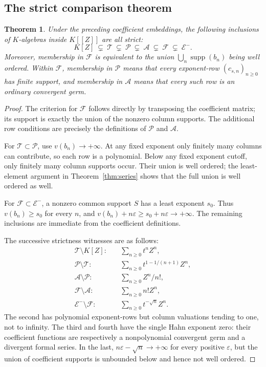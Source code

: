 \documentclass[11pt,a4paper]{article}
\numberwithin{equation}{section}
\newtheorem{theorem}{Theorem}[section]
\theoremstyle{definition}
\theoremstyle{remark}
\newcommand{\TT}{\mathcal T}
\newcommand{\PP}{\mathcal P}
\newcommand{\Ag}{\mathcal A}
\newcommand{\FF}{\mathcal F}
\newcommand{\EE}{\mathcal E}
\newcommand{\supp}{\operatorname{supp}}
\begin{document}
\subsection{The strict comparison theorem}
\begin{theorem}\label{thm:chain}
Under the preceding coefficient embeddings, the following inclusions of
$K$-algebras inside $K[[Z]]$ are all strict:
\begin{equation}\label{eq:chain}
 K[Z]\ \varsubsetneq\ \TT\ \varsubsetneq\ \PP
 \ \varsubsetneq\ \Ag\ \varsubsetneq\ \FF
 \ \varsubsetneq\ \EE^-.
\end{equation}
Moreover, membership in $\FF$ is equivalent to the union
$\bigcup_n\supp(b_n)$ being well ordered. Within $\FF$, membership in $\PP$
means that every exponent-row $(c_{s,n})_{n\ge0}$ has finite support, and
membership in $\Ag$ means that every such row is an ordinary convergent germ.
\end{theorem}
\begin{proof}
The criterion for $\FF$ follows directly by transposing the coefficient matrix;
its support is exactly the union of the nonzero column supports. The additional
row conditions are precisely the definitions of $\PP$ and $\Ag$.

For $\TT\subset\PP$, use $v(b_n)\to+\infty$. At any fixed exponent only
finitely many columns can contribute, so each row is a polynomial. Below any
fixed exponent cutoff, only finitely many column supports occur. Their union is
well ordered; the least-element argument in Theorem~\ref{thm:series} shows that
the full union is well ordered as well.

For $\FF\subset\EE^-$, a nonzero common support $S$ has a least exponent
$s_0$. Thus $v(b_n)\ge s_0$ for every $n$, and
$v(b_n)+n\varepsilon\ge s_0+n\varepsilon\to+\infty$.
The remaining inclusions are immediate from the coefficient definitions.

The successive strictness witnesses are as follows:
\begin{align*}
 \TT\setminus K[Z]:&\quad \sum_{n\ge0}t^nZ^n,\\
 \PP\setminus\TT:&\quad \sum_{n\ge0}t^{1-1/(n+1)}Z^n,\\
 \Ag\setminus\PP:&\quad \sum_{n\ge0}Z^n/n!,\\
 \FF\setminus\Ag:&\quad \sum_{n\ge0}n!Z^n,\\
 \EE^-\setminus\FF:&\quad \sum_{n\ge0}t^{-\sqrt n}Z^n.
\end{align*}
The second has polynomial exponent-rows but column valuations tending to one,
not to infinity. The third and fourth have the single Hahn exponent zero:
their coefficient functions are respectively a nonpolynomial convergent germ
and a divergent formal series. In the last, $n\varepsilon-\sqrt n\to+\infty$
for every positive $\varepsilon$, but the union of coefficient supports is
unbounded below and hence not well ordered.
\end{proof}
\end{document}
